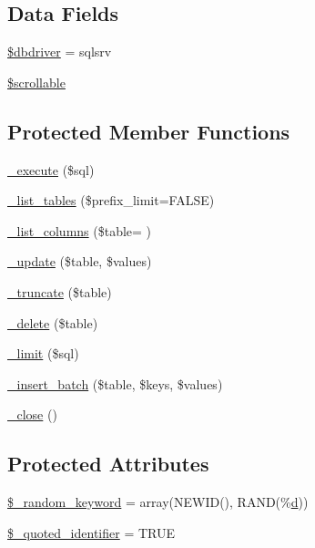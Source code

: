 \subsection*{Data Fields}
\begin{DoxyCompactItemize}
\item 
\hyperlink{class_c_i___d_b__sqlsrv__driver_a0cde2a16322a023d040aa7f725877597}{\$dbdriver} = \textquotesingle{}sqlsrv\textquotesingle{}
\item 
\hyperlink{class_c_i___d_b__sqlsrv__driver_a76095eacf021915db9aabc44ecf58555}{\$scrollable}
\end{DoxyCompactItemize}
\subsection*{Protected Member Functions}
\begin{DoxyCompactItemize}
\item 
\hyperlink{class_c_i___d_b__sqlsrv__driver_a114ab675d89bf8324a41785fb475e86d}{\+\_\+execute} (\$sql)
\item 
\hyperlink{class_c_i___d_b__sqlsrv__driver_a435c0f3ce54fe7daa178baa8532ebd54}{\+\_\+list\+\_\+tables} (\$prefix\+\_\+limit=F\+A\+L\+S\+E)
\item 
\hyperlink{class_c_i___d_b__sqlsrv__driver_a2a81bb476a5c76fe6f763b0557c1e4c2}{\+\_\+list\+\_\+columns} (\$table= \textquotesingle{}\textquotesingle{})
\item 
\hyperlink{class_c_i___d_b__sqlsrv__driver_a2540b03a93fa73ae74c10d0e16fc073e}{\+\_\+update} (\$table, \$values)
\item 
\hyperlink{class_c_i___d_b__sqlsrv__driver_aa029600528fc1ce660a23ff4b4667f95}{\+\_\+truncate} (\$table)
\item 
\hyperlink{class_c_i___d_b__sqlsrv__driver_a133ea8446ded52589bd22cc9163d0896}{\+\_\+delete} (\$table)
\item 
\hyperlink{class_c_i___d_b__sqlsrv__driver_a3a02ea06541b8ecc25a33a61651562c8}{\+\_\+limit} (\$sql)
\item 
\hyperlink{class_c_i___d_b__sqlsrv__driver_a1978e1358c812587a46e242630365099}{\+\_\+insert\+\_\+batch} (\$table, \$keys, \$values)
\item 
\hyperlink{class_c_i___d_b__sqlsrv__driver_a4d9082658000e5ede8312067c6dda9db}{\+\_\+close} ()
\end{DoxyCompactItemize}
\subsection*{Protected Attributes}
\begin{DoxyCompactItemize}
\item 
\hyperlink{class_c_i___d_b__sqlsrv__driver_a10213aa6e05f6d924d3277bb1d2fea00}{\$\+\_\+random\+\_\+keyword} = array(\textquotesingle{}N\+E\+W\+I\+D()\textquotesingle{}, \textquotesingle{}R\+A\+N\+D(\%\hyperlink{jquery_8canvasjs_8min_8js_a36541169dfff685f807208881a4f0021}{d})\textquotesingle{})
\item 
\hyperlink{class_c_i___d_b__sqlsrv__driver_a1dae2f0e9ad7299438a9976d6cdbf2ad}{\$\+\_\+quoted\+\_\+identifier} = T\+R\+U\+E
\end{DoxyCompactItemize}


